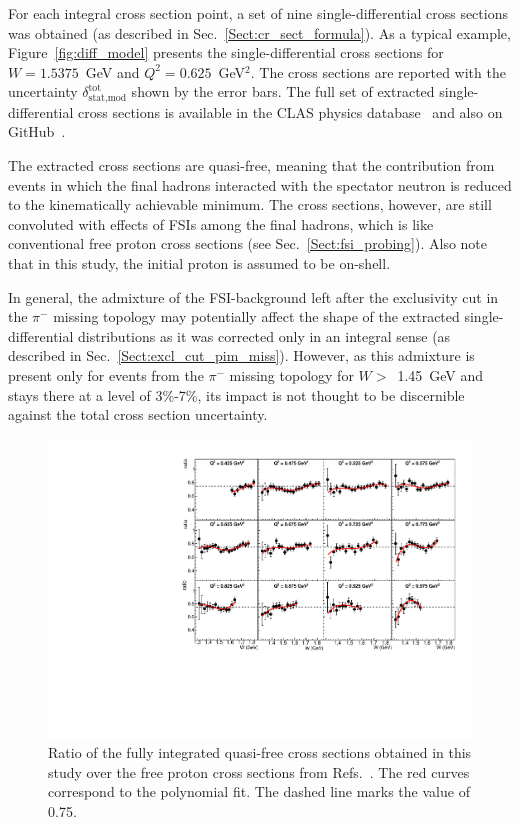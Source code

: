 \documentclass[prc,twocolumn,superscriptaddress,showpacs,amssymb,amsmath,amsfonts,aps,nofootinbib]{revtex4-1}
\begin{document}
For each integral cross section point, a set of nine single-differential cross sections was obtained (as described in Sec.\!~\ref{Sect:cr_sect_formula}). As a typical example, Figure~\ref{fig:diff_model} presents the single-differential cross sections for $W= 1.5375$~GeV and $Q^{2}= 0.625$~GeV$^{2}$. The cross sections are reported with the uncertainty $\delta_{\text{stat,mod}}^{\text{tot}}$ shown by the error bars. The full set of extracted single-differential cross sections is available in the CLAS physics database~\cite{CLAS_DB} and also on GitHub~\cite{Github:data}.


The extracted cross sections are quasi-free, meaning that the contribution from events in which the final hadrons interacted with the spectator neutron is reduced to the kinematically achievable minimum. The cross sections, however, are still convoluted with effects of FSIs among the final hadrons, which is like conventional free proton cross sections (see Sec.\!~\ref{Sect:fsi_probing}). Also note that in this study, the initial proton is assumed to be on-shell.


In general, the admixture of the FSI-background left after the exclusivity cut in the $\pi^{-}$ missing topology may potentially affect the shape of the extracted single-differential distributions as it was corrected only in an integral sense (as described in Sec.\!~\ref{Sect:excl_cut_pim_miss}). However, as this admixture is present only for events from the $\pi^{-}$ missing topology for $W>$~1.45~GeV and stays there at a level of 3\%-7\%, its impact is not thought to be discernible against the total cross section uncertainty.


\begin{figure}[htp]
\begin{center}
\includegraphics[width=16.25cm]{pictures/fed_comp/with_fed_w2.pdf}
\caption{\small Ratio of the fully integrated quasi-free cross sections obtained in this study over the free proton cross sections from Refs.\!~\cite{Fed_an_note:2017,Fed_paper_2018}. The red curves correspond to the polynomial fit. The dashed line marks the value of 0.75. } \label{fig:fed_w}
\end{center}
\end{figure}
\end{document}
